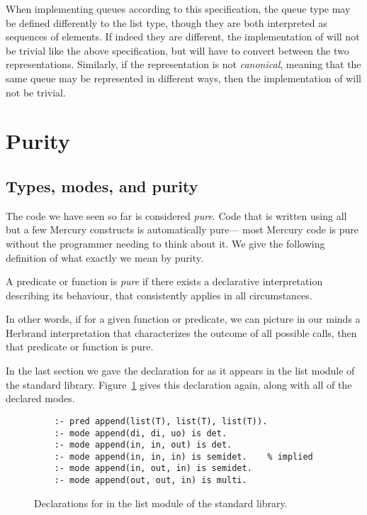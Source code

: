 When implementing queues according to this specification,
the queue type may be defined differently to the list type,
though they are both interpreted as sequences of elements.
If indeed they are different,
the implementation of 
will not be trivial like the above specification,
but will have to convert between the two representations.
Similarly,
if the representation is not \emph{canonical},
meaning that the same queue may be represented in different ways,
then the implementation of 
will not be trivial.


\section{Purity}
\label{sec:purity}

\subsection{Types, modes, and purity}
\label{sec:types-modes-purity}

The code we have seen so far is considered \emph{pure}.
Code that is written using
all but a few Mercury constructs
is automatically pure---%
most Mercury code is pure
without the programmer needing to think about it.
We give the following definition
of what exactly we mean by purity.

\begin{definition}[Purity] \label{gi:pure}
A predicate or function is \emph{pure}
if there exists a declarative interpretation describing its behaviour,
that consistently applies in all circumstances.
\end{definition}

\noindent
In other words,
if for a given function or predicate,
we can picture in our minds a Herbrand interpretation
that characterizes the outcome of all possible calls,
then that predicate or function is pure.

In the last section we gave
the  declaration for 
as it appears in the list module of the standard library.
Figure~\ref{fig:append-decls} gives this  declaration again,
along with all of the declared modes.

\begin{figure}
\begin{verbatim}
    :- pred append(list(T), list(T), list(T)).
    :- mode append(di, di, uo) is det.
    :- mode append(in, in, out) is det.
    :- mode append(in, in, in) is semidet.    % implied
    :- mode append(in, out, in) is semidet.
    :- mode append(out, out, in) is multi.
\end{verbatim}
\caption{
Declarations for 
in the list module of the standard library.
\label{fig:append-decls}}
\end{figure}

